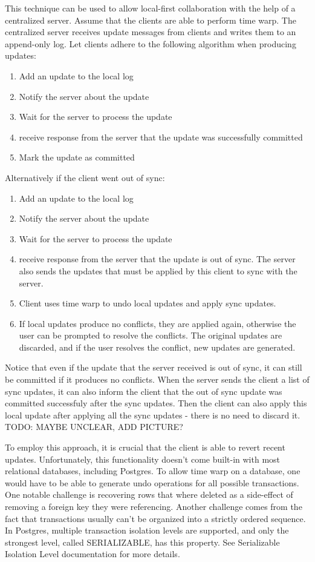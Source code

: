\documentclass[a4paper, 11pt, oneside]{article}
\theoremstyle{definition}
\begin{document}
This technique can be used to allow local-first collaboration with the help of a centralized server. Assume that the clients are able to perform time warp. The centralized server receives update messages from clients and writes them to an append-only log. Let clients adhere to the following algorithm when producing updates:

\begin{enumerate}
    \item Add an update to the local log
    \item Notify the server about the update
    \item Wait for the server to process the update
    \item receive response from the server that the update was successfully committed
    \item Mark the update as committed
\end{enumerate}

Alternatively if the client went out of sync:

\begin{enumerate}
    \item Add an update to the local log
    \item Notify the server about the update
    \item Wait for the server to process the update
    \item receive response from the server that the update is out of sync. The server also sends the updates that must be applied by this client to sync with the server.
    \item Client uses time warp to undo local updates and apply sync updates.
    \item If local updates produce no conflicts, they are applied again, otherwise the user can be prompted to resolve the conflicts. The original updates are discarded, and if the user resolves the conflict, new updates are generated.
\end{enumerate}

Notice that even if the update that the server received is out of sync, it can still be committed if it produces no conflicts. When the server sends the client a list of sync updates, it can also inform the client that the out of sync update was committed successfuly after the sync updates. Then the client can also apply this local update after applying all the sync updates - there is no need to discard it. TODO: MAYBE UNCLEAR, ADD PICTURE?

To employ this approach, it is crucial that the client is able to revert recent updates. Unfortunately, this functionality doesn't come built-in with most relational databases, including Postgres. To allow time warp on a database, one would have to be able to generate undo operations for all possible transactions. One notable challenge is recovering rows that where deleted as a side-effect of removing a foreign key they were referencing. Another challenge comes from the fact that transactions usually can't be organized into a strictly ordered sequence. In Postgres, multiple transaction isolation levels are supported, and only the strongest level, called SERIALIZABLE, has this property. See Serializable Isolation Level documentation \cite{tisolevel} for more details.
\end{document}

